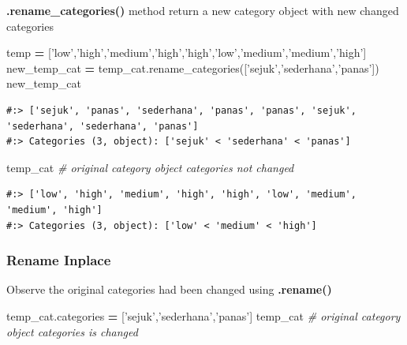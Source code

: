 \documentclass[
]{book}
\newenvironment{Shaded}{\begin{snugshade}}{\end{snugshade}}
\newcommand{\CommentTok}[1]{\textcolor[rgb]{0.37,0.37,0.37}{\textit{#1}}}
\newcommand{\NormalTok}[1]{#1}
\newcommand{\OperatorTok}[1]{\textcolor[rgb]{0.43,0.43,0.43}{\textbf{#1}}}
\newcommand{\StringTok}[1]{\textcolor[rgb]{0.5,0.5,0.5}{#1}}
\begin{document}
\textbf{.rename\_categories()} method return a new category object with new changed categories

\begin{Shaded}
\begin{Highlighting}[]
\NormalTok{temp }\OperatorTok{=}\NormalTok{ [}\StringTok{'low'}\NormalTok{,}\StringTok{'high'}\NormalTok{,}\StringTok{'medium'}\NormalTok{,}\StringTok{'high'}\NormalTok{,}\StringTok{'high'}\NormalTok{,}\StringTok{'low'}\NormalTok{,}\StringTok{'medium'}\NormalTok{,}\StringTok{'medium'}\NormalTok{,}\StringTok{'high'}\NormalTok{]}
\NormalTok{new_temp_cat }\OperatorTok{=}\NormalTok{ temp_cat.rename_categories([}\StringTok{'sejuk'}\NormalTok{,}\StringTok{'sederhana'}\NormalTok{,}\StringTok{'panas'}\NormalTok{])}
\NormalTok{new_temp_cat }
\end{Highlighting}
\end{Shaded}

\begin{verbatim}
#:> ['sejuk', 'panas', 'sederhana', 'panas', 'panas', 'sejuk', 'sederhana', 'sederhana', 'panas']
#:> Categories (3, object): ['sejuk' < 'sederhana' < 'panas']
\end{verbatim}

\begin{Shaded}
\begin{Highlighting}[]
\NormalTok{temp_cat   }\CommentTok{# original category object categories not changed}
\end{Highlighting}
\end{Shaded}

\begin{verbatim}
#:> ['low', 'high', 'medium', 'high', 'high', 'low', 'medium', 'medium', 'high']
#:> Categories (3, object): ['low' < 'medium' < 'high']
\end{verbatim}

\hypertarget{rename-inplace}{%
\subsubsection{Rename Inplace}\label{rename-inplace}}

Observe the original categories had been changed using \textbf{.rename()}

\begin{Shaded}
\begin{Highlighting}[]
\NormalTok{temp_cat.categories }\OperatorTok{=}\NormalTok{ [}\StringTok{'sejuk'}\NormalTok{,}\StringTok{'sederhana'}\NormalTok{,}\StringTok{'panas'}\NormalTok{]}
\NormalTok{temp_cat   }\CommentTok{# original category object categories is changed}
\end{Highlighting}
\end{Shaded}
\end{document}
